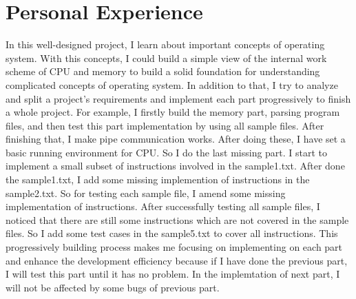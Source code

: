 \documentclass[a4paper]{report}
\begin{document}
\section*{Personal Experience}
In this well-designed project, I learn about important concepts of operating system. With this concepts, I could build a simple view of the internal work scheme of CPU and memory to build a solid foundation for understanding complicated concepts of operating system. In addition to that, I try to analyze and  split a project's requirements and implement each part progressively to finish a whole project. For example, I firstly build the memory part, parsing program files, and then test this part implementation by using all sample files. After finishing that, I make pipe communication works. After doing these, I have set a basic running environment for CPU. So I do the last missing part. I start to implement a small subset of instructions involved in the sample1.txt. After done the sample1.txt, I add some missing implemention of instructions in the sample2.txt. So for testing each sample file, I amend some missing implementation of instructions. After successfully testing all sample files, I noticed that there are still some instructions which are not covered in the sample files. So I add some test cases in the sample5.txt to cover all instructions. This progressively building process makes me focusing on implementing on each part and enhance the development efficiency because if I have done the previous part, I will test this part until it has no problem. In the implemtation of next part, I will not be affected by some bugs of previous part.
\end{document}

